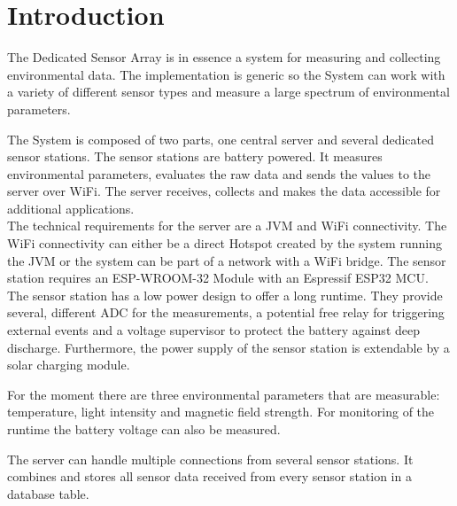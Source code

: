 %
%
\newcommand{\TITLE}{
Dedicated Sensor Array
}
\newcommand{\VERSION}{
2
}







\section{Introduction}
\justify

The Dedicated Sensor Array is in essence a system for measuring and collecting environmental data. The implementation is generic so the System can work with a variety of different sensor types and measure a large spectrum of environmental parameters. 


The System is composed of two parts, one central server and several dedicated sensor stations. The sensor stations are battery powered. It measures environmental parameters, evaluates the raw data and sends the values to the server over WiFi. The server receives, collects and makes the data accessible for additional applications. \\

The technical requirements for the server are a JVM and WiFi connectivity. The WiFi connectivity can either be a direct Hotspot created by the system running the JVM or the system can be part of a network with a WiFi bridge. The sensor station requires an ESP-WROOM-32 Module with an Espressif ESP32 MCU. \\

The sensor station has a low power design to offer a long runtime. They provide several, different ADC for the measurements, a potential free relay for triggering external events and a voltage supervisor to protect the battery against deep discharge. Furthermore, the power supply of the sensor station is extendable by a solar charging module.

For the moment there are three environmental parameters that are measurable: temperature, light intensity and magnetic field strength. For monitoring of the runtime the battery voltage can also be measured.

The server can handle multiple connections from several sensor stations. It combines and stores all sensor data received from every sensor station in a database table.\\


